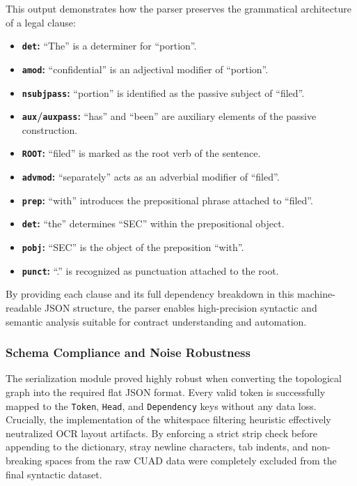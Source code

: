 \documentclass[twoside,final]{hcmut-report}
\begin{document}
\indent This output demonstrates how the parser preserves the grammatical architecture of a legal clause:
\begin{itemize}[topsep=0pt, parsep=0pt, itemsep=0pt, label=--]
  \item \textbf{\texttt{det}:} ``The'' is a determiner for ``portion''.
  \item \textbf{\texttt{amod}:} ``confidential'' is an adjectival modifier of ``portion''.
  \item \textbf{\texttt{nsubjpass}:} ``portion'' is identified as the passive subject of ``filed''.
  \item \textbf{\texttt{aux}/\texttt{auxpass}:} ``has'' and ``been'' are auxiliary elements of the passive construction.
  \item \textbf{\texttt{ROOT}:} ``filed'' is marked as the root verb of the sentence.
  \item \textbf{\texttt{advmod}:} ``separately'' acts as an adverbial modifier of ``filed''.
  \item \textbf{\texttt{prep}:} ``with'' introduces the prepositional phrase attached to ``filed''.
  \item \textbf{\texttt{det}:} ``the'' determines ``SEC'' within the prepositional object.
  \item \textbf{\texttt{pobj}:} ``SEC'' is the object of the preposition ``with''.
  \item \textbf{\texttt{punct}:} ``.'' is recognized as punctuation attached to the root.
\end{itemize}
\medskip

By providing each clause and its full dependency breakdown in this machine-readable JSON structure, the parser enables high-precision syntactic and semantic analysis suitable for contract understanding and automation.

\subsubsection*{Schema Compliance and Noise Robustness}
The serialization module proved highly robust when converting the topological graph into the required flat JSON format. Every valid token is successfully mapped to the \texttt{Token}, \texttt{Head}, and \texttt{Dependency} keys without any data loss. Crucially, the implementation of the whitespace filtering heuristic effectively neutralized OCR layout artifacts. By enforcing a strict strip check before appending to the dictionary, stray newline characters, tab indents, and non-breaking spaces from the raw CUAD data were completely excluded from the final syntactic dataset.
\end{document}
